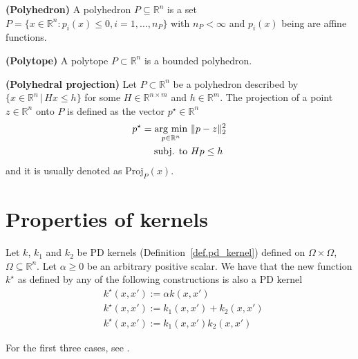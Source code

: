 \begin{definition}
	\textbf{(Polyhedron)}
	A polyhedron $P \subseteq \mathbb{R}^n$ is a set $P = \{x \in \mathbb{R}^n : p_i(x) \leq 0, i=1,\dots,n_P\}$ with $n_P < \infty$ and $p_i(x)$ being are affine functions.
\end{definition}

\begin{definition}
	\textbf{(Polytope)}
	A polytope $P \subset \mathbb{R}^n$ is a bounded polyhedron.
\end{definition}

\begin{definition}
	\textbf{(Polyhedral projection)}
	Let $P \subset \mathbb{R}^n$ be a polyhedron described by $\{x \in \mathbb{R}^n \, | \, H x \leq h \}$ for some $H \in \mathbb{R}^{n \times m}$ and $h \in \mathbb{R}^{m}$. The projection of a point $z \in \mathbb{R}^n$ onto $P$ is defined as the vector $p^\star \in \mathbb{R}^n$
	\begin{align}
		\label{def.pol_proj}
		p^\star = \operatorname*{\arg\,\min}_{p \in \mathbb{R}^n} \ &\Vert p - z \Vert_2^2 \\
		\text{subj. to} \ & H p \leq h \nonumber
	\end{align}
	and it is usually denoted as $\text{Proj}_P(x)$.
\end{definition}






\chapter{Properties of kernels}

Let $k$, $k_1$ and $k_2$ be PD kernels (Definition~\ref{def.pd_kernel}) defined on $\Omega \times \Omega$, $\Omega \subseteq \mathbb{R}^n$. Let $\alpha \geq 0$ be an arbitrary positive scalar. We have that the new function $k^\star$ as defined by any of the following constructions is also a PD kernel
\begin{align}
	& k^\star(x,x') := \alpha k(x,x') \\
	& k^\star(x,x') := k_1(x,x') + k_2(x,x') \\
	& k^\star(x,x') := k_1(x,x') k_2(x,x') 
\end{align}

\begin{my_proof}
	For the first three cases, see \cite[§4]{steinwart2008svm_book}.
\end{my_proof}

